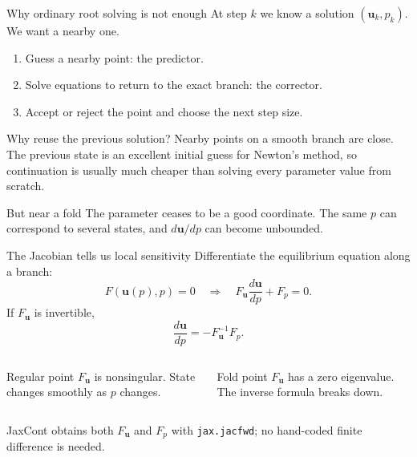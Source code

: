 \documentclass[aspectratio=169,10pt]{beamer}
\newcommand{\state}{\bm{u}}
\begin{document}
\begin{frame}{Why ordinary root solving is not enough}
At step $k$ we know a solution $(\state_k,p_k)$. We want a nearby one.
\begin{enumerate}
  \item Guess a nearby point: the \alert{predictor}.
  \item Solve equations to return to the exact branch: the \alert{corrector}.
  \item Accept or reject the point and choose the next step size.
\end{enumerate}
\begin{block}{Why reuse the previous solution?}
Nearby points on a smooth branch are close. The previous state is an excellent initial guess for Newton's method, so continuation is usually much cheaper than solving every parameter value from scratch.
\end{block}
\begin{alertblock}{But near a fold}
The parameter ceases to be a good coordinate. The same $p$ can correspond to several states, and $d\state/dp$ can become unbounded.
\end{alertblock}
\end{frame}

\begin{frame}{The Jacobian tells us local sensitivity}
Differentiate the equilibrium equation along a branch:
\[
  F(\state(p),p)=0
  \quad\Longrightarrow\quad
  F_{\state}\frac{d\state}{dp}+F_p=0.
\]
If $F_{\state}$ is invertible,
\[
  \frac{d\state}{dp}=-F_{\state}^{-1}F_p.
\]
\begin{columns}[T]
\begin{block}{Regular point}
$F_{\state}$ is nonsingular. State changes smoothly as $p$ changes.
\end{block}
\begin{alertblock}{Fold point}
$F_{\state}$ has a zero eigenvalue. The inverse formula breaks down.
\end{alertblock}
\end{columns}
JaxCont obtains both $F_{\state}$ and $F_p$ with \texttt{jax.jacfwd}; no hand-coded finite difference is needed.
\end{frame}
\end{document}
